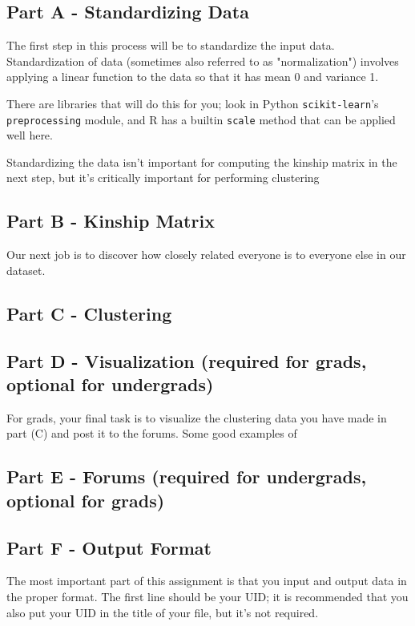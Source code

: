 \documentclass{article}
\begin{document}
\subsection*{Part A - Standardizing Data}
The first step in this process will be to standardize the input data.
Standardization of data (sometimes also referred to as "normalization")
involves applying a linear function to the data so that it has mean 0
and variance 1.

There are libraries that will do this for you; look in Python \verb!scikit-learn!'s
\verb!preprocessing! module, and R has a builtin \verb!scale! method that
can be applied well here.

Standardizing the data isn't important for computing the kinship matrix
in the next step, but it's critically important for performing clustering

\subsection*{Part B - Kinship Matrix}
Our next job is to discover how closely related everyone
is to everyone else in our dataset.
\vspace{1.5 cm}

\subsection*{Part C - Clustering}

\subsection*{Part D - Visualization (required for grads, optional for undergrads)}

For grads, your final task is to visualize the clustering data you have made in part (C)
and post it to the forums. Some good examples of

\subsection*{Part E - Forums (required for undergrads, optional for grads)}



\clearpage
\subsection*{Part F - Output Format}
The most important part of this assignment is that you
input and output data in the proper format. The first line
should be your UID; it is recommended that you also put
your UID in the title of your file, but it's not required.
\end{document}
